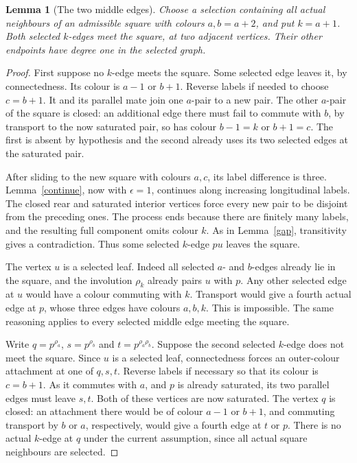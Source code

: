 \documentclass[11pt,a4paper]{article}
\newtheorem{lemma}[theorem]{Lemma}
\begin{document}
\begin{lemma}[The two middle edges]\label{middle}
Choose a selection containing all actual neighbours of an
admissible square with colours $a,b=a+2$, and put $k=a+1$.
Both selected $k$-edges meet the square, at two adjacent
vertices. Their other endpoints have degree one in the
selected graph.
\end{lemma}
\begin{proof}
First suppose no $k$-edge meets the square. Some selected
edge leaves it, by connectedness. Its colour is $a-1$ or
$b+1$. Reverse labels if needed to choose $c=b+1$. It and
its parallel mate join one $a$-pair to a new pair. The
other $a$-pair of the square is closed: an additional edge
there must fail to commute with $b$, by transport to the
now saturated pair, so has colour $b-1=k$ or $b+1=c$.
The first is absent by hypothesis and the second already
uses its two selected edges at the saturated pair.

After sliding to the new square with colours $a,c$, its
label difference is three. Lemma~\ref{continue}, now with
$\epsilon=1$, continues along increasing longitudinal
labels. The closed rear and saturated interior vertices
force every new pair to be disjoint from the preceding ones.
The process ends because there are finitely many labels,
and the resulting full component omits colour $k$. As in
Lemma~\ref{gap}, transitivity gives a contradiction. Thus
some selected $k$-edge $pu$ leaves the square.

The vertex $u$ is a selected leaf. Indeed all selected
$a$- and $b$-edges already lie in the square, and the
involution $\rho_k$ already pairs $u$ with $p$. Any other
selected edge at $u$ would have a colour commuting with
$k$. Transport would give a fourth actual edge at $p$,
whose three edges have colours $a,b,k$. This is impossible.
The same reasoning applies to every selected middle edge
meeting the square.

Write $q=p^{\rho_a}$, $s=p^{\rho_b}$ and
$t=p^{\rho_a\rho_b}$. Suppose the second selected
$k$-edge does not meet the square. Since $u$ is a selected
leaf, connectedness forces an outer-colour attachment at
one of $q,s,t$. Reverse labels if necessary so that its
colour is $c=b+1$. As it commutes with $a$, and $p$ is
already saturated, its two parallel edges must leave $s,t$.
Both of these vertices are now saturated. The vertex $q$
is closed: an attachment there would be of colour $a-1$
or $b+1$, and commuting transport by $b$ or $a$,
respectively, would give a fourth edge at $t$ or $p$.
There is no actual $k$-edge at $q$ under the current
assumption, since all actual square neighbours are selected.


\end{proof}
\end{document}
